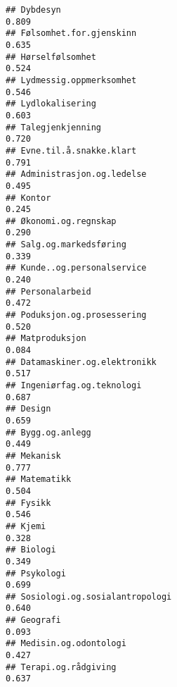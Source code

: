 \documentclass[
]{article}
\begin{document}
\begin{verbatim}
## Dybdesyn                                                                         0.809
## Følsomhet.for.gjenskinn                                                          0.635
## Hørselfølsomhet                                                                  0.524
## Lydmessig.oppmerksomhet                                                          0.546
## Lydlokalisering                                                                  0.603
## Talegjenkjenning                                                                 0.720
## Evne.til.å.snakke.klart                                                          0.791
## Administrasjon.og.ledelse                                                        0.495
## Kontor                                                                           0.245
## Økonomi.og.regnskap                                                              0.290
## Salg.og.markedsføring                                                            0.339
## Kunde..og.personalservice                                                        0.240
## Personalarbeid                                                                   0.472
## Poduksjon.og.prosessering                                                        0.520
## Matproduksjon                                                                    0.084
## Datamaskiner.og.elektronikk                                                      0.517
## Ingeniørfag.og.teknologi                                                         0.687
## Design                                                                           0.659
## Bygg.og.anlegg                                                                   0.449
## Mekanisk                                                                         0.777
## Matematikk                                                                       0.504
## Fysikk                                                                           0.546
## Kjemi                                                                            0.328
## Biologi                                                                          0.349
## Psykologi                                                                        0.699
## Sosiologi.og.sosialantropologi                                                   0.640
## Geografi                                                                         0.093
## Medisin.og.odontologi                                                            0.427
## Terapi.og.rådgiving                                                              0.637

\end{verbatim}
\end{document}
